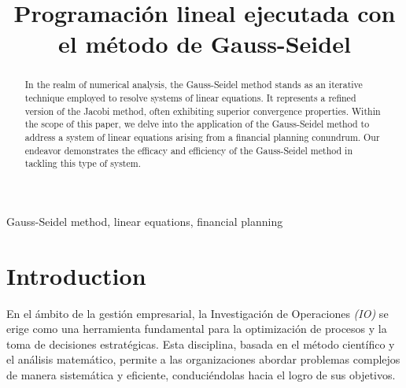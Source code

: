 \documentclass[conference]{IEEEtran}
\begin{document}
\title{Programación lineal ejecutada con el método de Gauss-Seidel\\}

\author{
\and
{}
\and
{}
}

\maketitle



\begin{abstract}
In the realm of numerical analysis, the Gauss-Seidel method stands as an 
iterative technique employed to resolve systems of linear equations. It 
represents a refined version of the Jacobi method, often exhibiting 
superior convergence properties. Within the scope of this paper, we delve 
into the application of the Gauss-Seidel method to address a system of 
linear equations arising from a financial planning conundrum. Our 
endeavor demonstrates the efficacy and efficiency of the Gauss-Seidel 
method in tackling this type of system.
\end{abstract}

\begin{IEEEkeywords}
Gauss-Seidel method, linear equations, financial planning
\end{IEEEkeywords}

\nocite{source_code}

\section{Introduction}
En el ámbito de la gestión empresarial, la Investigación de Operaciones 
\textit{(IO)} se erige como una herramienta fundamental para la optimización de 
procesos y la toma de decisiones estratégicas. Esta disciplina, basada 
en el método científico y el análisis matemático, permite a las 
organizaciones abordar problemas complejos de manera sistemática y 
eficiente, conduciéndolas hacia el logro de sus objetivos.
\end{document}
